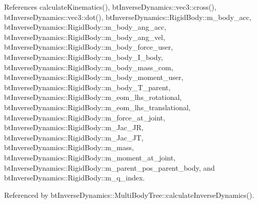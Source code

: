 References calculateKinematics(), btInverseDynamics::vec3::cross(), btInverseDynamics::vec3::dot(), btInverseDynamics::RigidBody::m\_\-body\_\-acc, btInverseDynamics::RigidBody::m\_\-body\_\-ang\_\-acc, btInverseDynamics::RigidBody::m\_\-body\_\-ang\_\-vel, btInverseDynamics::RigidBody::m\_\-body\_\-force\_\-user, btInverseDynamics::RigidBody::m\_\-body\_\-I\_\-body, btInverseDynamics::RigidBody::m\_\-body\_\-mass\_\-com, btInverseDynamics::RigidBody::m\_\-body\_\-moment\_\-user, btInverseDynamics::RigidBody::m\_\-body\_\-T\_\-parent, btInverseDynamics::RigidBody::m\_\-eom\_\-lhs\_\-rotational, btInverseDynamics::RigidBody::m\_\-eom\_\-lhs\_\-translational, btInverseDynamics::RigidBody::m\_\-force\_\-at\_\-joint, btInverseDynamics::RigidBody::m\_\-Jac\_\-JR, btInverseDynamics::RigidBody::m\_\-Jac\_\-JT, btInverseDynamics::RigidBody::m\_\-mass, btInverseDynamics::RigidBody::m\_\-moment\_\-at\_\-joint, btInverseDynamics::RigidBody::m\_\-parent\_\-pos\_\-parent\_\-body, and btInverseDynamics::RigidBody::m\_\-q\_\-index.

Referenced by btInverseDynamics::MultiBodyTree::calculateInverseDynamics().

